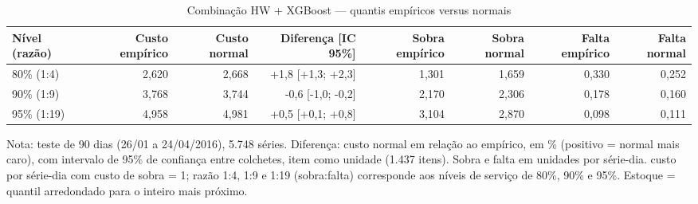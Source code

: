 \begin{table}[htbp]
\centering
\small
\caption{Combinação HW + XGBoost — quantis empíricos versus normais}
\label{tab:comb_empirico_vs_normal}
\begin{tabular}{lrrrrrrr}
\toprule
Nível (razão) & Custo empírico & Custo normal & Diferença [IC 95\%] & Sobra empírico & Sobra normal & Falta empírico & Falta normal \\
\midrule
80\% (1:4) & 2,620 & 2,668 & +1,8 [+1,3; +2,3] & 1,301 & 1,659 & 0,330 & 0,252 \\
90\% (1:9) & 3,768 & 3,744 & -0,6 [-1,0; -0,2] & 2,170 & 2,306 & 0,178 & 0,160 \\
95\% (1:19) & 4,958 & 4,981 & +0,5 [+0,1; +0,8] & 3,104 & 2,870 & 0,098 & 0,111 \\
\bottomrule
\end{tabular}
\par\smallskip
{\footnotesize Nota: teste de 90 dias (26/01 a 24/04/2016), 5.748 séries. Diferença: custo normal em relação ao empírico, em \% (positivo = normal mais caro), com intervalo de 95\% de confiança entre colchetes, item como unidade (1.437 itens). Sobra e falta em unidades por série-dia. custo por série-dia com custo de sobra = 1; razão 1:4, 1:9 e 1:19 (sobra:falta) corresponde aos níveis de serviço de 80\%, 90\% e 95\%. Estoque = quantil arredondado para o inteiro mais próximo.}
\end{table}
